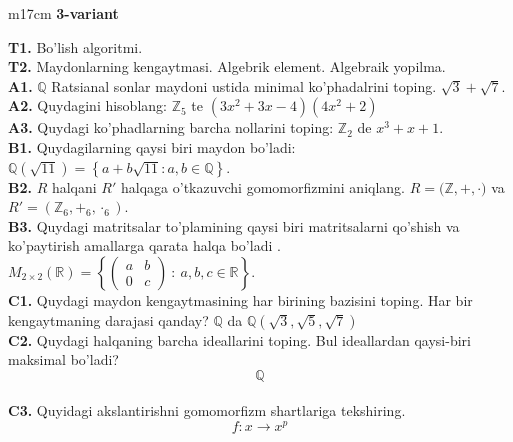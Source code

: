 \documentclass{article}
\begin{document}
\begin{tabular}{m{17cm}}
\textbf{3-variant}
\newline

\textbf{T1.} Bo'lish algoritmi. \\
\textbf{T2.} Maydonlarning kengaytmasi. Algebrik element. Algebraik yopilma. \\
\textbf{A1.} \(\mathbb{Q}\) Ratsianal sonlar maydoni ustida minimal ko'phadalrini toping.
\(\sqrt{3} + \sqrt{7}\). \\
\textbf{A2.} Quydagini hisoblang:
\(\mathbb{Z}_{5}\) te \(\left( 3x^{2} + 3x - 4 \right)\left( 4x^{2} + 2 \right)\) \\
\textbf{A3.} Quydagi ko'phadlarning barcha nollarini toping:
\(\mathbb{Z}_{2}\) de \(x^{3} + x + 1\). \\
\textbf{B1.} Quydagilarning qaysi biri maydon bo'ladi:
\(\mathbb{Q}\left( \sqrt{11} \right) = \left\{ a + b\sqrt{11}:a,b \in \mathbb{Q} \right\}\). \\
\textbf{B2.} \(R\) halqani \(R'\) halqaga o'tkazuvchi gomomorfizmini aniqlang.
\(R\mathbb{= (Z,} + , \cdot )\) va \(R' = (\mathbb{Z}_{6}, +_{6}, \cdot_{6})\). \\
\textbf{B3.} Quydagi matritsalar to'plamining qaysi biri matritsalarni qo'shish va ko'paytirish amallarga qarata halqa bo'ladi .
\(M_{2 \times 2}\mathbb{(R) =}\left\{ \begin{pmatrix}
a & b \\
0 & c
\end{pmatrix}\ :\ a,b,c \in \mathbb{R} \right\}\). \\
\textbf{C1.} Quydagi maydon kengaytmasining har birining bazisini toping. Har bir kengaytmaning darajasi qanday?
\(\mathbb{Q}\) da \(\mathbb{Q}\left( \sqrt{3},\sqrt{5},\sqrt{7} \right)\) \\
\textbf{C2.} Quydagi halqaning barcha ideallarini toping. Bul ideallardan qaysi-biri maksimal bo'ladi?
\[\mathbb{Q}\] \\
\textbf{C3.} Quyidagi akslantirishni gomomorfizm shartlariga tekshiring.
\[f:x \rightarrow x^{p}\] \\

\end{tabular}
\vspace{1cm}
\end{document}
